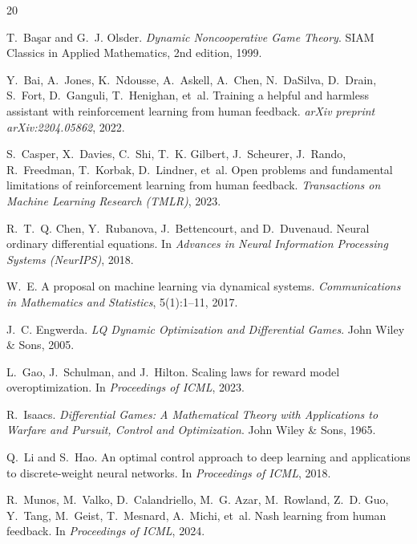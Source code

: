 \documentclass[10pt]{article}
\begin{document}
\begin{thebibliography}{20}

T.~Ba\c{s}ar and G.~J. Olsder.
\newblock \emph{Dynamic Noncooperative Game Theory}.
\newblock SIAM Classics in Applied Mathematics, 2nd edition, 1999.

Y.~Bai, A.~Jones, K.~Ndousse, A.~Askell, A.~Chen, N.~DaSilva, D.~Drain, S.~Fort, D.~Ganguli, T.~Henighan, et~al.
\newblock Training a helpful and harmless assistant with reinforcement learning from human feedback.
\newblock \emph{arXiv preprint arXiv:2204.05862}, 2022.

S.~Casper, X.~Davies, C.~Shi, T.~K. Gilbert, J.~Scheurer, J.~Rando, R.~Freedman, T.~Korbak, D.~Lindner, et~al.
\newblock Open problems and fundamental limitations of reinforcement learning from human feedback.
\newblock \emph{Transactions on Machine Learning Research (TMLR)}, 2023.

R.~T.~Q. Chen, Y.~Rubanova, J.~Bettencourt, and D.~Duvenaud.
\newblock Neural ordinary differential equations.
\newblock In \emph{Advances in Neural Information Processing Systems (NeurIPS)}, 2018.

W.~E.
\newblock A proposal on machine learning via dynamical systems.
\newblock \emph{Communications in Mathematics and Statistics}, 5(1):1--11, 2017.

J.~C. Engwerda.
\newblock \emph{LQ Dynamic Optimization and Differential Games}.
\newblock John Wiley \& Sons, 2005.

L.~Gao, J.~Schulman, and J.~Hilton.
\newblock Scaling laws for reward model overoptimization.
\newblock In \emph{Proceedings of ICML}, 2023.

R.~Isaacs.
\newblock \emph{Differential Games: A Mathematical Theory with Applications to Warfare and Pursuit, Control and Optimization}.
\newblock John Wiley \& Sons, 1965.

Q.~Li and S.~Hao.
\newblock An optimal control approach to deep learning and applications to discrete-weight neural networks.
\newblock In \emph{Proceedings of ICML}, 2018.

R.~Munos, M.~Valko, D.~Calandriello, M.~G. Azar, M.~Rowland, Z.~D. Guo, Y.~Tang, M.~Geist, T.~Mesnard, A.~Michi, et~al.
\newblock Nash learning from human feedback.
\newblock In \emph{Proceedings of ICML}, 2024.


\end{thebibliography}
\end{document}
